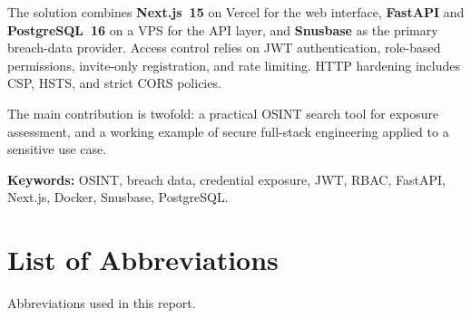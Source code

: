 The solution combines \textbf{Next.js~15} on Vercel for the web interface,
\textbf{FastAPI} and \textbf{PostgreSQL~16} on a VPS for the API layer, and
\textbf{Snusbase} as the primary breach-data provider. Access control relies
on JWT authentication, role-based permissions, invite-only registration, and
rate limiting. HTTP hardening includes CSP, HSTS, and strict CORS policies.

The main contribution is twofold: a practical OSINT search tool for exposure
assessment, and a working example of secure full-stack engineering applied
to a sensitive use case.

\textbf{Keywords:} OSINT, breach data, credential exposure, JWT, RBAC,
FastAPI, Next.js, Docker, Snusbase, PostgreSQL.

\clearpage

\chapter*{List of Abbreviations}

\noindent
Abbreviations used in this report.

